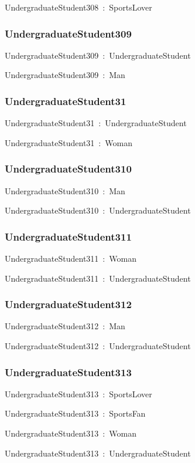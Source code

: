 \documentclass{article}
\begin{document}
UndergraduateStudent308~:~SportsLover

\subsubsection*{UndergraduateStudent309}

UndergraduateStudent309~:~UndergraduateStudent

UndergraduateStudent309~:~Man

\subsubsection*{UndergraduateStudent31}

UndergraduateStudent31~:~UndergraduateStudent

UndergraduateStudent31~:~Woman

\subsubsection*{UndergraduateStudent310}

UndergraduateStudent310~:~Man

UndergraduateStudent310~:~UndergraduateStudent

\subsubsection*{UndergraduateStudent311}

UndergraduateStudent311~:~Woman

UndergraduateStudent311~:~UndergraduateStudent

\subsubsection*{UndergraduateStudent312}

UndergraduateStudent312~:~Man

UndergraduateStudent312~:~UndergraduateStudent

\subsubsection*{UndergraduateStudent313}

UndergraduateStudent313~:~SportsLover

UndergraduateStudent313~:~SportsFan

UndergraduateStudent313~:~Woman

UndergraduateStudent313~:~UndergraduateStudent
\end{document}
